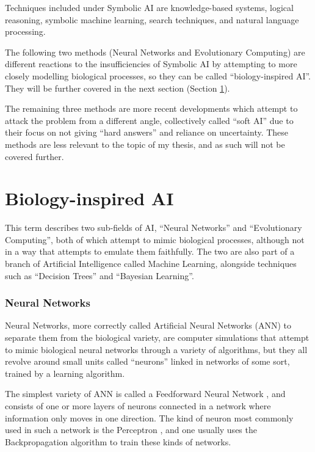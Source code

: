 Techniques included under Symbolic AI are knowledge-based systems, logical
reasoning, symbolic machine learning, search techniques, and natural language
processing.

The following two methods (Neural Networks and Evolutionary Computing) are
different reactions to the insufficiencies of Symbolic AI by attempting to more
closely modelling biological processes, so they can be called ``biology-inspired
AI''. They will be further covered in the next section (Section
\ref{sec:biology-inspired-ai}).

The remaining three methods are more recent developments which attempt to attack
the problem from a different angle, collectively called ``soft AI'' due to their
focus on not giving ``hard answers'' and reliance on uncertainty. These methods
are less relevant to the topic of my thesis, and as such will not be covered
further.

\section{Biology-inspired AI}
\label{sec:biology-inspired-ai}

This term describes two sub-fields of AI, ``Neural Networks'' and ``Evolutionary
Computing'', both of which attempt to mimic biological processes, although not
in a way that attempts to emulate them faithfully. The two are also part of a
branch of Artificial Intelligence called Machine Learning, alongside techniques
such as ``Decision Trees'' and ``Bayesian Learning''.

\subsubsection{Neural Networks}
\label{sec:neural-networks}

Neural Networks, more correctly called Artificial Neural Networks (ANN) to
separate them from the biological variety, are computer simulations that attempt
to mimic biological neural networks through a variety of algorithms, but they
all revolve around small units called ``neurons'' linked in networks of some
sort, trained by a learning algorithm.

The simplest variety of ANN is called a Feedforward Neural Network
\citep{wikipediafeedforward}, and consists of one or more layers of neurons
connected in a network where information only moves in one direction. The kind
of neuron most commonly used in such a network is the Perceptron
\citep{minsky1969perceptrons}, and one usually uses the Backpropagation
\citep{wikipediabackpropagation} algorithm to train these kinds of networks.

